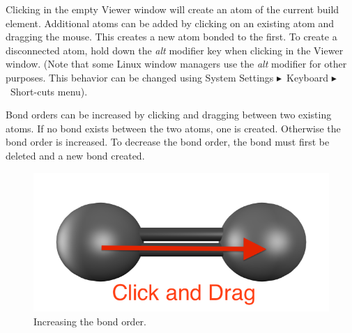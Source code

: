 \documentclass[a4paper,12pt]{article}
\newcommand{\bt}{\ensuremath{\blacktriangleright}}
\begin{document}
Clicking in the empty Viewer window will create an atom of the current build
element. Additional atoms can be added by clicking on an existing atom and
dragging the mouse.  This creates a new atom bonded to the first.  To create a
disconnected atom, hold down the \emph{alt} modifier key when clicking in the
Viewer window.  (Note that some Linux window managers use the \emph{alt} modifier
for other purposes.  This behavior can be changed using System Settings 
\bt\ Keyboard \bt\ Short-cuts menu).

Bond orders can be increased by clicking and dragging between two existing
atoms.  If no bond exists between the two atoms,  one is created.  Otherwise
the bond order is increased.  To decrease the bond order, the bond must first
be deleted and a new bond created.
\begin{figure}[h]
\begin{center}
\includegraphics[scale=0.25]{figures/Cdouble.png}
\caption{Increasing the bond order.}
\end{center}
\end{figure}
\end{document}
